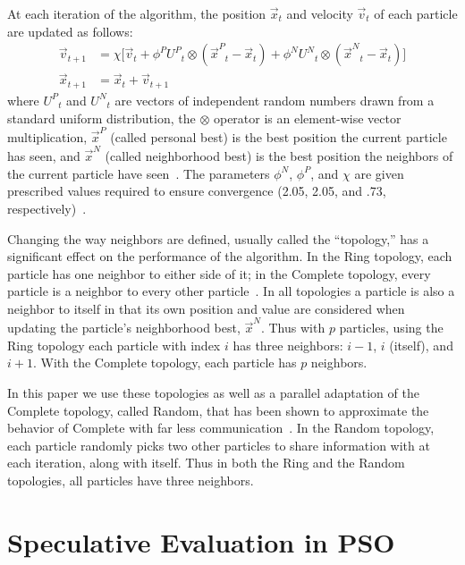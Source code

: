 \documentclass{llncs}
\providecommand{\pers}{\ensuremath{P}}
\providecommand{\neigh}{\ensuremath{N}}
\providecommand{\nURand}{\ensuremath{U^\neigh}}
\providecommand{\pURand}{\ensuremath{U^\pers}}
\providecommand{\ppos}{\ensuremath{\Vec{x}}}
\providecommand{\pvel}{\ensuremath{\Vec{v}}}
\providecommand{\nbest}{\ensuremath{\Vec{x}^\neigh}}
\providecommand{\pbest}{\ensuremath{\Vec{x}^\pers}}
\providecommand{\constriction}{\ensuremath{\chi}}
\providecommand{\ncoeff}{\ensuremath{\phi^\neigh}}
\providecommand{\pcoeff}{\ensuremath{\phi^\pers}}
\begin{document}
At each iteration of the algorithm, the position $\ppos_t$ and velocity
$\pvel_t$ of each particle are updated as follows:
\begin{align}
\label{eq:velupdate}
	\pvel_{t+1} &=
		\constriction \bigl[ \pvel_t
			+ \pcoeff\pURand_{t}\otimes(\pbest_{t} - \ppos_{t})
			+ \ncoeff\nURand_{t}\otimes(\nbest_{t} - \ppos_{t})
		\bigr] \\
\label{eq:posupdate}
	\ppos_{t+1} &= \ppos_{t} + \pvel_{t+1}
\end{align}
where \( \pURand_{t} \) and \( \nURand_{t} \) are vectors of independent random
numbers drawn from a standard uniform distribution, the \( \otimes \) operator
is an element-wise vector multiplication, $\pbest$ (called personal best) is
the best position the current particle has seen, and $\nbest$ (called
neighborhood best) is the best position the neighbors of the current particle
have seen~\cite{bratton-2007-defining-a-standard-for-pso}.  The parameters \(
\ncoeff \), \( \pcoeff \), and \( \constriction \) are given prescribed values
required to ensure convergence (2.05, 2.05, and .73,
respectively)~\cite{clerc-2002-constricted-pso}. 

Changing the way neighbors are defined, usually called the ``topology,''
has a significant effect on the performance of the algorithm.  In
the Ring topology, each particle has one neighbor to either side of it; in the
Complete topology, every particle is a neighbor to every other
particle~\cite{bratton-2007-defining-a-standard-for-pso}.  In all topologies a
particle is also a neighbor to itself in that its own position and value are
considered when updating the particle's neighborhood best, $\nbest$.  Thus with
$p$ particles, using the Ring topology each particle with index $i$ has three
neighbors: $i-1$, $i$ (itself), and $i+1$.  With the Complete topology, each
particle has $p$ neighbors.

In this paper we use these topologies as well as a parallel adaptation of the
Complete topology, called Random, that has been shown to approximate the
behavior of Complete with far less
communication~\cite{mcnabb-2009-large-particle-swarms}.  In the Random
topology, each particle randomly picks two other particles to share information
with at each iteration, along with itself.  Thus in both the Ring and the
Random topologies, all particles have three neighbors.

\section{Speculative Evaluation in PSO}
\label{sec:sepso}
\end{document}

